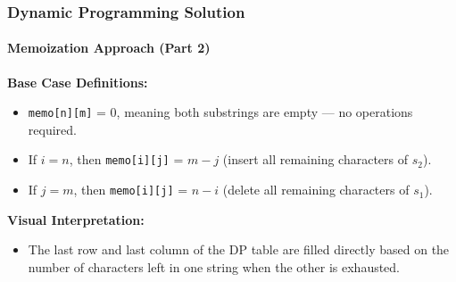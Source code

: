 \documentclass[10pt,aspectratio=43]{beamer}
\begin{document}
\begin{frame}
    \frametitle{Dynamic Programming Solution}
    \framesubtitle{Memoization Approach (Part 2)}

    \textbf{Base Case Definitions:}
    \begin{itemize}
        \item \texttt{memo[n][m]} = 0, meaning both substrings are empty — no operations required.
        \item If $i = n$, then \texttt{memo[i][j]} = $m - j$ (insert all remaining characters of $s_2$).
        \item If $j = m$, then \texttt{memo[i][j]} = $n - i$ (delete all remaining characters of $s_1$).
    \end{itemize}

    \vspace{0.3cm}

    \textbf{Visual Interpretation:}
    \begin{itemize}
        \item The last row and last column of the DP table are filled directly based on the number of characters left in one string when the other is exhausted.
    \end{itemize}
\end{frame}
\end{document}

